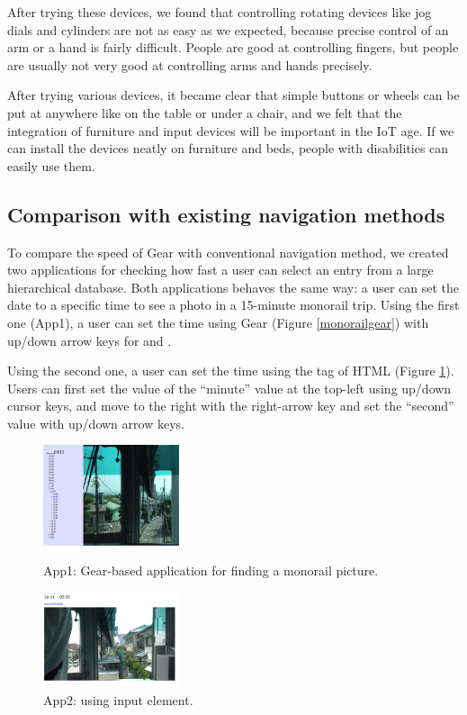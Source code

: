 \documentclass[conference]{IEEEtran}
\def\up{\tsf{▲}}
\def\down{\tsf{▼}}
\begin{document}
After trying these devices, we found that controlling rotating devices
like jog dials and cylinders are not as easy as we expected,
because precise control of an arm or a hand is fairly difficult.
People are good at controlling fingers, but people are usually not very good at
controlling arms and hands precisely.

After trying various devices, it became clear that simple buttons or
wheels can be put at anywhere like on the table or under a chair, and
we felt that the integration of furniture and input devices will be
important in the IoT age\cite{10.1145/2494091.2497326}.
%
If we can install the devices neatly on furniture and beds,
people with disabilities can easily use them.

\subsection{Comparison with existing navigation methods}

To compare the speed of Gear with conventional navigation method,
we created two applications for checking how fast a user can select an entry
from a large hierarchical database.
%
Both applications behaves the same way:
a user can set the date to a specific time to see a photo in a 15-minute monorail trip.
%
Using the first one (App1), a user can set the time using Gear (Figure \ref{monorailgear})
with up/down arrow keys for {\up} and {\down}.

Using the second one, a user can set the time using the  tag of HTML (Figure \ref{monorailinput}).
Users can first set the value of the ``minute'' value at the top-left using up/down cursor keys,
and move to the right with the right-arrow key and set the ``second'' value with up/down arrow keys.

\begin{figure}[H]
  \begin{minipage}{0.49\hsize}
    \centerline{\includegraphics[width=40mm,bb=0 0 1624 1193]{figures/75007628f75ef1038bd5737e10a728b7.png}}
    \caption{App1: Gear-based application for finding a monorail picture.}
    \label{monorailgear}
  \end{minipage}
  \begin{minipage}{0.49\hsize}
    \centerline{\includegraphics[width=40mm,bb=0 0 1596 1116]{figures/325208a6d94c68e4f08e61a67df419c4.png}}
    \caption{App2: using input element.}
    \label{monorailinput}
  \end{minipage}
\end{figure}
\end{document}
